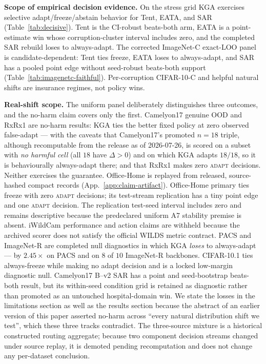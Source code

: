 \medskip
\textbf{Scope of empirical decision evidence.} On the stress grid \textsc{KGA} exercises selective
adapt/freeze/abstain behavior for Tent, EATA, and SAR (Table~\ref{tab:decisive}). Tent is the
CI-robust beats-both arm, EATA is a point-estimate win whose corruption-cluster interval includes
zero, and the completed SAR rebuild loses to always-adapt. The corrected ImageNet-C exact-LOO panel is
candidate-dependent: Tent ties freeze, EATA loses to always-adapt, and SAR has a pooled point edge
without seed-robust beats-both support (Table~\ref{tab:imagenetc-faithful}). Per-corruption CIFAR-10-C and helpful natural shifts are
insurance regimes, not policy wins.

\textbf{Real-shift scope.} The uniform panel deliberately distinguishes three outcomes, and the
no-harm claim covers only the first. Camelyon17
genuine OOD and RxRx1 are no-harm results: KGA ties the better fixed policy at
zero observed false-adapt --- with the caveats that Camelyon17's promoted $n{=}18$ triple, although
recomputable from the release as of 2026-07-26, is scored on a subset with \emph{no harmful cell}
(all $18$ have $\Delta>0$) and on which \textsc{KGA} adapts $18/18$, so it is behaviourally
always-adapt there; and that RxRx1 makes zero \textsc{adapt} decisions. Neither exercises the
guarantee. Office-Home is replayed from released, source-hashed compact records
(App.~\ref{app:claim-artifact}). Office-Home primary ties freeze with zero \textsc{adapt}
decisions; its test-stream replication has a tiny point edge and one \textsc{adapt} decision. The
replication test-seed interval includes zero and remains descriptive because the predeclared uniform
A7 stability premise is absent. iWildCam performance and action claims are withheld because the
archived scorer does not satisfy the official WILDS metric contract. PACS and ImageNet-R are completed null
diagnostics in which \textsc{KGA} \emph{loses} to always-adapt --- by $2.45\times$ on PACS and on $8$
of $10$ ImageNet-R backbones. CIFAR-10.1 ties always-freeze while making no adapt decision and is a
locked low-margin diagnostic null. Camelyon17 B--v2 SAR has a point and seed-bootstrap beats-both
result, but its within-seed condition grid is retained as diagnostic rather than promoted as an
untouched hospital-domain win. We state the losses in
the limitations section as well as the results section because the abstract of an earlier version of
this paper asserted no-harm across ``every natural distribution shift we test'', which these three
tracks contradict.
The three-source mixture is a historical constructed routing aggregate; because two component
decision streams changed under source replay, it is demoted pending recomputation and does not
change any per-dataset conclusion.

